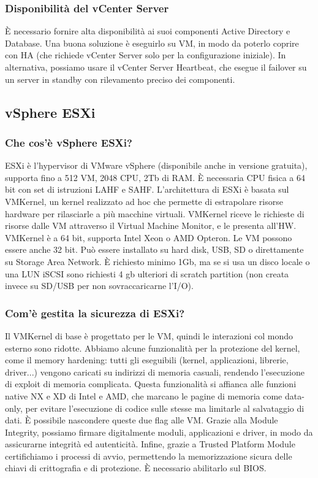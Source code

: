\documentclass[11pt]{article}
\begin{document}
\subsubsection{Disponibilità del vCenter Server}
È necessario fornire alta disponibilità ai suoi componenti Active Directory e Database. Una buona soluzione è eseguirlo su VM, in modo da poterlo coprire con HA (che richiede vCenter Server solo per la configurazione iniziale). In alternativa, possiamo usare il vCenter Server Heartbeat, che esegue il failover su un server in standby con rilevamento preciso dei componenti. 

\subsection{vSphere ESXi}
\subsubsection{Che cos'è vSphere ESXi?}
ESXi è l'hypervisor di VMware vSphere (disponibile anche in versione gratuita), supporta fino a 512 VM, 2048 CPU, 2Tb di RAM. È necessaria CPU fisica a 64 bit con set di istruzioni LAHF e SAHF. L'architettura di ESXi è basata sul VMKernel, un kernel realizzato ad hoc che permette di estrapolare risorse hardware per rilasciarle a più macchine virtuali. VMKernel riceve le richieste di risorse dalle VM attraverso il Virtual Machine Monitor, e le presenta all'HW. VMKernel è a 64 bit, supporta Intel Xeon o AMD Opteron. Le VM possono essere anche 32 bit. 
Può essere installato su hard disk, USB, SD o direttamente su Storage Area Network. È richiesto minimo 1Gb, ma se si usa un disco locale o una LUN iSCSI sono richiesti 4 gb ulteriori di scratch partition (non creata invece su SD/USB per non sovraccaricarne l'I/O). 

\subsubsection{Com'è gestita la sicurezza di ESXi?}
Il VMKernel di base è progettato per le VM, quindi le interazioni col mondo esterno sono ridotte. Abbiamo alcune funzionalità per la protezione del kernel, come il memory hardening: tutti gli eseguibili (kernel, applicazioni, librerie, driver...) vengono caricati su indirizzi di memoria casuali, rendendo l'esecuzione di exploit di memoria complicata. Questa funzionalità si affianca alle funzioni native NX e XD di Intel e AMD, che marcano le pagine di memoria come data-only, per evitare l'esecuzione di codice sulle stesse ma limitarle al salvataggio di dati. È possibile nascondere queste due flag alle VM. Grazie alla Module Integrity, possiamo firmare digitalmente moduli, applicazioni e driver, in modo da assicurarne integrità ed autenticità. Infine, grazie a Trusted Platform Module certifichiamo i processi di avvio, permettendo la memorizzazione sicura delle chiavi di crittografia e di protezione. È necessario abilitarlo sul BIOS.
\end{document}
